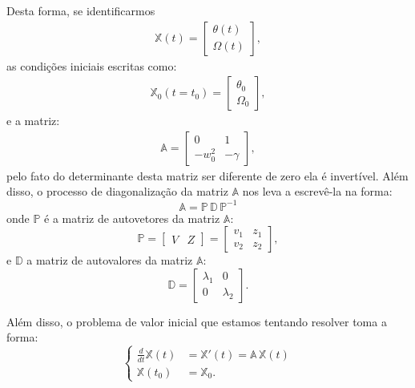 \documentclass[12pt,openright,twoside,english,brazil]{abntex2}
\begin{document}
Desta forma, se identificarmos
\begin{eqnarray}
 \mathbb{X}(t) = \begin{bmatrix}
          \theta(t) \\
          \Omega(t)
         \end{bmatrix},
 \label{equa74}
\end{eqnarray}
as condições iniciais escritas como:
\begin{eqnarray}
 \mathbb{X}_0(t=t_0) = \begin{bmatrix}
             \theta_0 \\
             \Omega_0
            \end{bmatrix}, \nonumber
\end{eqnarray}
e a matriz:
\begin{eqnarray}
 \mathbb{A} = \begin{bmatrix}
      0 & 1 \\
      -w_0^2 & -\gamma
      \end{bmatrix},
 \label{equa75}
\end{eqnarray}
pelo fato do determinante desta matriz ser diferente de zero ela é invertível.  Além disso, o processo de diagonalização da matriz $\mathbb{A}$ nos leva a escrevê-la na forma:
\begin{equation}
 \mathbb{A} = \mathbb{P}\, \mathbb{D}\, \mathbb{P}^{-1}
 \label{equa76}
\end{equation}
onde $\mathbb{P}$ é a matriz de autovetores da matriz $\mathbb{A}$:
\begin{equation}
 \mathbb{P} = \begin{bmatrix}
      V & Z
      \end{bmatrix} = \begin{bmatrix}
                       v_1 & z_1 \\
                       v_2 & z_2
                      \end{bmatrix},
 \label{equa77}
\end{equation}
e $\mathbb{D}$ a matriz de autovalores da matriz $\mathbb{A}$:
\begin{equation}
 \mathbb{D} = \begin{bmatrix}
      \lambda_1 & 0 \\
      0 & \lambda_2
     \end{bmatrix}.
 \label{equa78}
\end{equation}


Além disso, o problema de valor inicial que estamos tentando resolver toma a forma:
\begin{equation}
 \begin{cases}
  \frac{d}{dt}\mathbb{X}(t) & =  \mathbb{X}'(t) =  \mathbb{A}\, \mathbb{X}(t) \\
  \mathbb{X}(t_0) & = \mathbb{X}_0.
 \end{cases}
 \label{equa79}
\end{equation}
\end{document}
